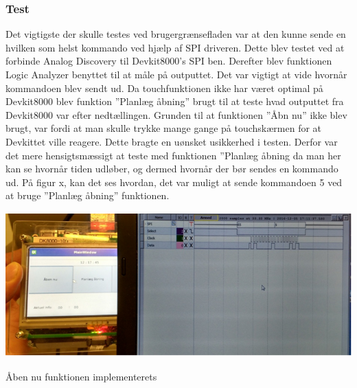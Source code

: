 \subsubsection{Test}

Det vigtigste der skulle testes ved brugergrænsefladen var at den kunne sende en hvilken som helst kommando ved hjælp af SPI driveren. Dette blev testet ved at forbinde Analog Discovery til Devkit8000’s SPI ben. Derefter blev funktionen Logic Analyzer benyttet til at måle på outputtet. Det var vigtigt at vide hvornår kommandoen blev sendt ud. Da touchfunktionen ikke har været optimal på Devkit8000 blev funktion ”Planlæg åbning” brugt til at teste hvad outputtet fra Devkit8000 var efter nedtællingen. Grunden til at funktionen ”Åbn nu” ikke blev brugt, var fordi at man skulle trykke mange gange på touchskærmen for at Devkittet ville reagere. Dette bragte en uønsket usikkerhed i testen. Derfor var det mere hensigtsmæssigt at teste med funktionen ”Planlæg åbning da man her kan se hvornår tiden udløber, og dermed hvornår der bør sendes en kommando ud. På figur x, kan det ses hvordan, det var muligt at sende kommandoen 5 ved at bruge ”Planlæg åbning” funktionen. 

\includegraphics{Billeder/test_GUI}
\caption{Åben nu funktionen implementerets}
